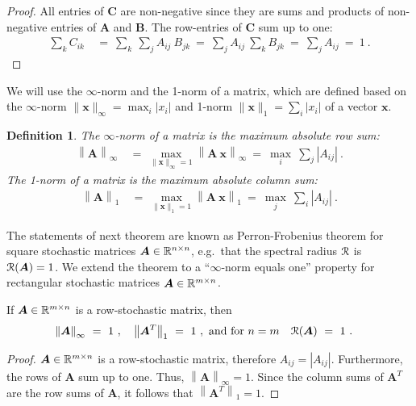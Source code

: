 \documentclass{article}
\newtheorem{definitionA}{Definition}
\newcommand\Bx{\bm{x}}
\newcommand\BA{\bm{A}}
\newcommand\BB{\bm{B}}
\newcommand\BC{\bm{C}}
\begin{document}
\begin{appendices}
\begin{proof}
  All entries of $\BC$ are non-negative since they are sums and
  products of non-negative entries of $\BA$ and
  $\BB$.
  The row-entries of $\BC$ sum up to one:
  \begin{align}
  \sum_{k} C_{ik} \ &= \ \sum_{k} \ \sum_{j} A_{ij} \ B_{jk} \ = \
   \sum_{j} A_{ij} \ \sum_{k} B_{jk} \ = \  \sum_{j} A_{ij} \ = \ 1 \ .
\end{align} 
\end{proof}


We will use the $\infty$-norm and the
1-norm of a matrix, which are defined based on the
$\infty$-norm $\|\Bx\|_{\infty}=\max_i|x_i|$ and 1-norm $\|\Bx\|_1=\sum_i|x_i|$
of a vector $\Bx$.
\begin{definitionA}
The $\infty$-norm of a matrix is the maximum absolute row sum: 
\begin{align}
  \left\|\BA\right\|_{\infty}  \ &= \ \max_{\|\Bx\|_{\infty}=1}
  \left\|\BA \ \Bx \right\|_{\infty} \ = \
  \max_i \ \sum_j \left| A_{ij} \right| \ .
\end{align} 
The 1-norm of a matrix is the maximum absolute column sum: 
\begin{align}
  \left\|\BA\right\|_1  \ &= \ \max_{\|\Bx\|_1=1} \left\|\BA \ \Bx \right\|_1  \ = \
  \max_j \ \sum_i \left| A_{ij} \right| \ .
\end{align} 
\end{definitionA}


The statements of next theorem are known as Perron-Frobenius theorem
for square stochastic matrices $\BA \in \dR^{n\times n}$, e.g.\ that
the spectral radius $\mathcal{R}$ is $\cR(\BA) = 1$.
We extend the theorem to a ``$\infty$-norm equals one'' property for
rectangular stochastic matrices $\BA \in \dR^{m\times n}$. 
\begin{lemmaA}[Perron-Frobenius]
\label{th:Aperron}
If $\BA \in \dR^{m\times n}$ is a row-stochastic matrix, then
\begin{align}
  \left\|\BA\right\|_{\infty} \ &= \ 1 \ , \quad   \left\|\BA^T
  \right\|_1 \ = \ 1 \ , \text{ and for } n=m  \quad \cR (\BA) \ = \ 1 \ .
\end{align} 
\end{lemmaA}

\begin{proof}
$\BA \in \dR^{m\times n}$ is a row-stochastic matrix, therefore
$A_{ij}=\left| A_{ij} \right|$. Furthermore, the rows of $\BA$ sum up
to one. Thus,  $\left\|\BA\right\|_{\infty} = 1$.
Since the column sums of $\BA^T$ are the row sums of $\BA$, it follows
that  $\left\|\BA^T \right\|_1 = 1$.


\end{proof}
\end{appendices}
\end{document}
